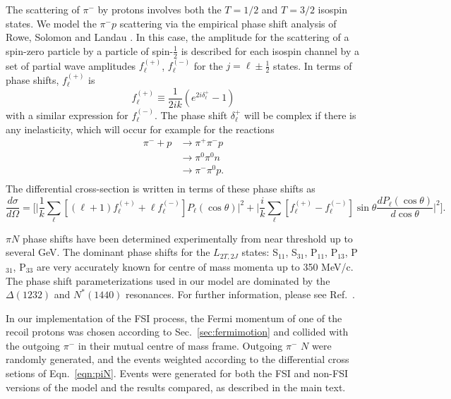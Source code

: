 The scattering of $\pi^-$ by protons involves both the $T=1/2$ and $T=3/2$
isospin states.  We model the $\pi^- p$ scattering via the empirical phase
shift analysis of Rowe, Solomon and Landau \cite{rowe}.  In this case,
the amplitude for the scattering of a spin-zero particle by a particle of
spin-$\frac{1}{2}$ is described for each isospin channel by a set of partial
wave amplitudes $f^{(+)}_{\ell}$, $f^{(-)}_{\ell}$ for the
$j=\ell\pm\frac{1}{2}$ states.  In terms of phase shifts, $f^{(+)}_{\ell}$ is
\begin{equation}
f^{(+)}_{\ell}\equiv\frac{1}{2ik}(e^{2i\delta^+_{\ell}} -1)
\end{equation}
with a similar expression for $f^{(-)}_{\ell}$.  The phase shift
$\delta^+_{\ell}$ will be complex if there is any inelasticity, which will
occur for example for the reactions
\begin{equation}
\begin{split}
\pi^- + p &\rightarrow \pi^+ \pi^- p \\
          &\rightarrow \pi^0 \pi^0 n \\
          &\rightarrow \pi^- \pi^0 p. \\
\end{split}
\end{equation}
The differential cross-section is written in terms of these phase shifts as
\begin{equation}
\frac{d\sigma}{d\Omega}=\biggl[
\biggl| \frac{1}{k}\sum_{\ell}[(\ell +1) 
f^{(+)}_{\ell} +\ell f^{(-)}_{\ell}] P_{\ell}(\cos\theta)\biggr|^2 +
\biggl| \frac{i}{k}\sum_{\ell}[f^{(+)}_{\ell} -f^{(-)}_{\ell}]\sin\theta 
 \frac{d P_{\ell}(\cos\theta)}{d\cos\theta}\biggr|^2
\biggr].
\label{eqn:piN}
\end{equation}

$\pi N$ phase shifts have been determined experimentally from near threshold up
to several GeV.  The dominant phase shifts for the $L_{2T,2J}$ states:
S$_{11}$, S$_{31}$, P$_{11}$, P$_{13}$, P$_{31}$, P$_{33}$ are very accurately
known for centre of mass momenta up to 350 MeV/c.  The phase shift
parameterizations used in our model are dominated by the $\Delta(1232)$ and
$N^*(1440)$ resonances.  For further information, please see
Ref.~\cite{ericson}.

In our implementation of the FSI process, the Fermi momentum of one of the
recoil protons was chosen according to Sec.~\ref{sec:fermimotion} and collided
with the outgoing $\pi^-$ in their mutual centre of mass frame.  Outgoing
$\pi^-$ $N$ were randomly generated, and the events
weighted according to the differential cross setions of Eqn.~\ref{eqn:piN}.
Events were generated for both the FSI and non-FSI versions of the
model and the results compared, as described in the main text.
